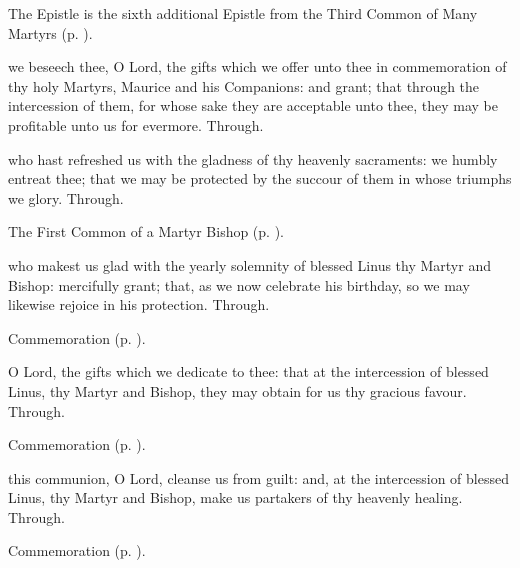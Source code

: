 \begin{rubric}
	The Epistle is the sixth additional Epistle from the Third Common of Many Martyrs (p. \pageref{Revelation713}).
\end{rubric}

\secret
{} we beseech thee, O Lord, the gifts which we offer unto thee in commemoration of thy holy Martyrs, Maurice and his Companions: and grant; that through the intercession of them, for whose sake they are acceptable unto thee, they may be profitable unto us for evermore. Through.

\postcommunion
{} who hast refreshed us with the gladness of thy heavenly sacraments: we humbly entreat thee; that we may be protected by the succour of them in whose triumphs we glory. Through.



\begin{rubric}
	The First Common of a Martyr Bishop (p. \pageref{CommonMartyrBishopI}).
\end{rubric}

\collect
{} who makest us glad with the yearly solemnity of blessed Linus thy Martyr and Bishop: mercifully grant; that, as we now celebrate his birthday, so we may likewise rejoice in his protection. Through.

\begin{rubric}
    Commemoration  (p. \pageref{TheclaCollect}).
\end{rubric}

\secret
{} O Lord, the gifts which we dedicate to thee: that at the intercession of blessed Linus, thy Martyr and Bishop, they may obtain for us thy gracious favour. Through.

\begin{rubric}
    Commemoration  (p. \pageref{TheclaSecret}).
\end{rubric}

\postcommunion
{} this communion, O Lord, cleanse us from guilt: and, at the intercession of blessed Linus, thy Martyr and Bishop, make us partakers of thy heavenly healing. Through.

\begin{rubric}
    Commemoration  (p. \pageref{TheclaPostcommunion}).
\end{rubric}


